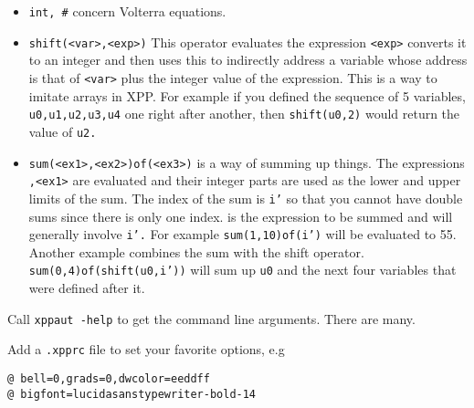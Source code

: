 \begin{itemize}
\item {\tt int, \#} concern Volterra equations.
\item {\tt shift(<var>,<exp>)} This operator evaluates the expression
{\tt <exp>} converts it to an integer and then uses this to indirectly
address a variable whose address is that of {\tt <var>} plus the
integer value of the expression.  This is a way to imitate arrays in
XPP.  For example if you defined the sequence of 5 variables, {\tt
u0,u1,u2,u3,u4} one right after another, then {\tt shift(u0,2)} would
return the value of {\tt u2.} 
\item {\tt sum(<ex1>,<ex2>)of(<ex3>)} is a way of summing up things.
The expressions {\tt <ex1>,<ex1>} are evaluated and their integer
parts are used as the lower and upper limits of the sum.  The index of
the sum is {\tt i'} so that you cannot have double sums since there is
only one index.  {\tt <ex3>} is the expression to be summed and will
generally involve {\tt i'.}  For example  {\tt sum(1,10)of(i')} will
be evaluated to 55.  Another example combines the sum with the shift
operator.  {\tt sum(0,4)of(shift(u0,i'))} will sum up {\tt u0} and the
next four variables that were defined after it.  
\end{itemize}


\medskip
\noindent Call {\tt xppaut -help} to get the command line arguments. There are many.

\medskip
\noindent Add a {\tt .xpprc} file to set your favorite options, e.g
\begin{verbatim}
@ bell=0,grads=0,dwcolor=eeddff
@ bigfont=lucidasanstypewriter-bold-14
\end{verbatim}












